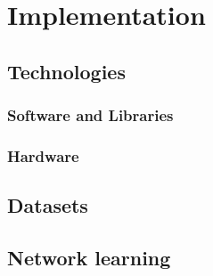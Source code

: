 \chapter{Implementation}
\section{Technologies}
\subsection{Software and Libraries}
\subsection{Hardware}
\section{Datasets}
\section{Network learning}